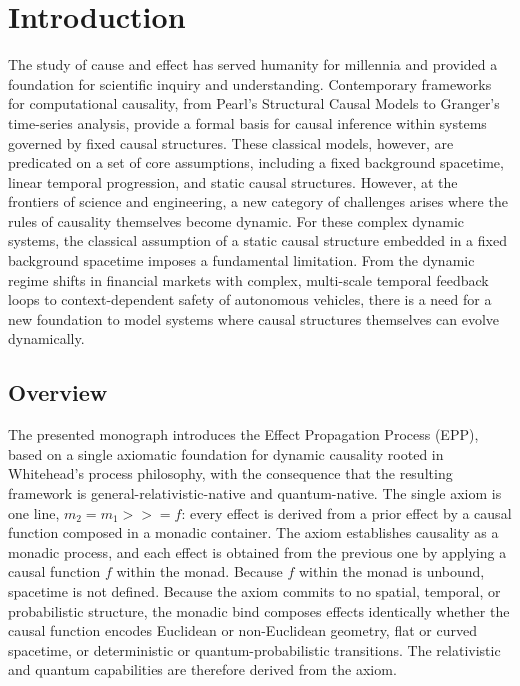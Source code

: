 \section{Introduction}
\label{sec:introduction}

The study of cause and effect has served humanity for millennia and provided a foundation for scientific inquiry and understanding. Contemporary frameworks for computational causality, from Pearl's Structural Causal Models to Granger's time-series analysis, provide a formal basis for causal inference within systems governed by fixed causal structures. These classical models, however, are predicated on a set of core assumptions, including a fixed background spacetime, linear temporal progression, and static causal structures. However, at the frontiers of science and engineering, a new category of challenges arises where the rules of causality themselves become dynamic. For these complex dynamic systems, the classical assumption of a static causal structure embedded in a fixed background spacetime imposes a fundamental limitation. From the dynamic regime shifts in financial markets with complex, multi-scale temporal feedback loops to context-dependent safety of autonomous vehicles, there is a need for a new foundation to model systems where causal structures themselves can evolve dynamically.

\subsection{Overview}

The presented monograph introduces the Effect Propagation Process (EPP), based on a single axiomatic foundation for dynamic causality rooted in Whitehead's process philosophy, with the consequence that the resulting framework is general-relativistic-native and quantum-native. The single axiom is one line, $m_2 = m_1 \mathbin{>\!\!>\!\!=} f$: every effect is derived from a prior effect by a causal function composed in a monadic container. The axiom establishes causality as a monadic process, and each effect is obtained from the previous one by applying a causal function $f$ within the monad. Because $f$ within the monad is unbound, spacetime is not defined. Because the axiom commits to no spatial, temporal, or probabilistic structure, the monadic bind composes effects identically whether the causal function encodes Euclidean or non-Euclidean geometry, flat or curved spacetime, or deterministic or quantum-probabilistic transitions. The relativistic and quantum capabilities are therefore derived from the axiom.

